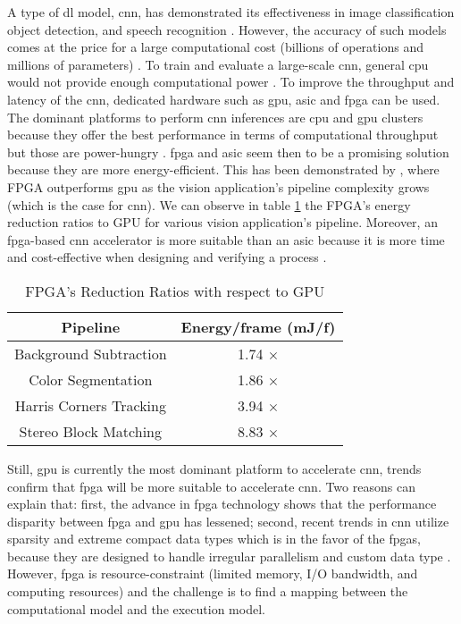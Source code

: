 A type of \acrshort{dl} model, \acrfull{cnn}, has demonstrated its effectiveness in image classiﬁcation object detection, and speech recognition \cite{shawahna_fpga-based_2019}. However, the accuracy of such models comes at the price for a large computational cost (billions of operations and millions of parameters) \cite{szegedy_going_2014}. To train and evaluate a large-scale \acrshort{cnn}, general \acrfull{cpu} would not provide enough computational power \cite{liu_fpga-based_2019}. To improve the throughput and latency of the \acrshort{cnn}, dedicated hardware such as \acrfull{gpu}, \acrfull{asic} and \acrfull{fpga} can be used. The dominant platforms to perform \acrshort{cnn} inferences are \acrshort{cpu} and \acrshort{gpu} clusters because they offer the best performance in terms of computational throughput but those are power-hungry \cite{liu_uniform_2019}.
\acrshort{fpga} and \acrshort{asic} seem then to be a promising solution because they are more energy-efficient. This has been demonstrated by \textcite{qasaimeh_comparing_2019}, where FPGA outperforms \acrshort{gpu} as the vision application’s pipeline complexity grows (which is the case for \acrshort{cnn}). We can observe in table \ref{tab:benchener} the FPGA’s energy reduction ratios to GPU for various vision application’s pipeline. Moreover, an \acrshort{fpga}-based \acrshort{cnn} accelerator is more suitable than an \acrshort{asic} because it is more time and cost-effective when designing and verifying a process \cite{motamedi_placid_2017}.
%
\begin{table}
    \center
    \begin{tabular}{|c|c|}
        \hline
        Pipeline & Energy/frame (mJ/f) \\
        \hline
        Background Subtraction & 1.74 $\times$\\
        \hline
        Color Segmentation & 1.86 $\times$ \\
        \hline
        Harris Corners Tracking & 3.94 $\times$ \\
        \hline
        Stereo Block Matching & 8.83 $\times$ \\
        \hline
    \end{tabular}
    \caption{FPGA’s Reduction Ratios with respect to GPU \cite{qasaimeh_comparing_2019}}
    \label{tab:benchener}
\end{table}

Still, \acrshort{gpu} is currently the most dominant platform to accelerate \acrshort{cnn}, trends confirm that \acrshort{fpga} will be more suitable to accelerate \acrshort{cnn}. Two reasons can explain that: first, the advance in \acrshort{fpga} technology shows that the performance disparity between \acrshort{fpga} and \acrshort{gpu} has lessened; second, recent trends in \acrshort{cnn} utilize sparsity and extreme compact data types which is in the favor of the \acrshort{fpga}s, because they are designed to handle irregular parallelism and custom data type \cite{nurvitadhi_can_2017}. However, \acrshort{fpga} is resource-constraint (limited memory, I/O bandwidth, and computing resources) and the challenge is to find a mapping between the computational model and the execution model.


